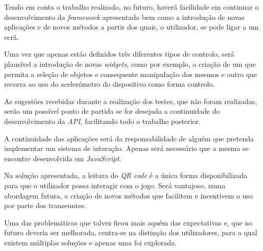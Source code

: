 Tendo em conta o trabalho realizado, no futuro, haverá facilidade em continuar o desenvolvimento da \textit{framework} apresentada bem como a introdução de novas aplicações e de novos métodos a partir dos quais, o utilizador, se pode ligar a um ecrã.

Uma vez que apenas estão definidos três diferentes tipos de controlo, será plausível a introdução de novas \textit{widgets}, como por exemplo, a criação de um que permita a seleção de objetos e consequente manipulação dos mesmos e outro que recorra ao uso do acelerómetro do dispositivo como forma controlo.

As sugestões recebidas durante a realização dos testes, que não foram realizadas, serão um possível ponto de partida se for desejada a continuidade do desenvolvimento da \textit{API}, facilitando todo o trabalho posterior. 

A continuidade das aplicações será da responsabilidade de alguém que pretenda implementar um sistema de interação. Apenas será necessário que a mesma se encontre desenvolvida em \textit{JavaScript}.

Na solução apresentada, a leitura do \textit{QR code} é a única forma disponibilizada para que o utilizador possa interagir com o jogo. Será vantajoso, numa abordagem futura, a criação de novos métodos que facilitem e incentivem o uso por parte dos transeuntes.

Uma das problemáticas que talvez ficou mais aquém das expectativas e, que no futuro deveria ser melhorada, centra-se na distinção dos utilizadores, para a qual existem múltiplas soluções e apenas uma foi explorada.

